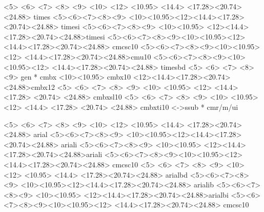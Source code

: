 \def\fileversion{v2.2f}
\def\filedate{1994/06/21}

   {  <5> <6> <7> <8> <9> <10> <12> 
      <10.95> 
      <14.4>  
      <17.28><20.74><24.88> times}{}
    {
      <5><6><7><8><9>
      <10><10.95><12><14.4><17.28><20.74><24.88> timesi%
      }{}
    {
      <5><6><7><8><9>
      <10><10.95>
      <12><14.4><17.28><20.74><24.88>timesi%
      }{}
    {
      <5><6><7><8><9><10><10.95><12>
      <14.4><17.28><20.74><24.88> cmcsc10
      }{}
%
   {
      <5><6><7><8><9><10><10.95><12>%
      <14.4><17.28><20.74><24.88>cmu10%
      }{}
     {
      <5><6><7><8><9><10><10.95><12>
      <14.4><17.28><20.74><24.88> timesbd}{}
   {
      <5> <6> <7> <8> <9> gen * cmbx
      <10><10.95> cmbx10
      <12><14.4><17.28><20.74><24.88>cmbx12
      }{}
      {
      <5> <6> <7> <8> <9>
      <10> <10.95> <12> <14.4> <17.28> <20.74> <24.88> cmbxsl10
      }{}
      {
      <5> <6>  <7>  <8> <9>
      <10> <10.95> <12> <14.4> <17.28> <20.74> <24.88> cmbxti10
      }{}
%
      {<->ssub * cmr/m/ui}{}





   {  <5> <6> <7> <8> <9> <10> <12> 
      <10.95> 
      <14.4>  
      <17.28><20.74><24.88> arial}{}
    {
      <5><6><7><8><9>
      <10><10.95><12><14.4><17.28><20.74><24.88> ariali%
      }{}
    {
      <5><6><7><8><9>
      <10><10.95>
      <12><14.4><17.28><20.74><24.88>ariali%
      }{}
    {
      <5><6><7><8><9><10><10.95><12>
      <14.4><17.28><20.74><24.88> cmcsc10
      }{}
   {  <5> <6> <7> <8> <9> <10> <12> 
      <10.95> 
      <14.4>  
      <17.28><20.74><24.88> arialbd}{}
    {
      <5><6><7><8><9>
      <10><10.95><12><14.4><17.28><20.74><24.88> arialib%
      }{}
    {
      <5><6><7><8><9>
      <10><10.95>
      <12><14.4><17.28><20.74><24.88>arialbi%
      }{}
    {
      <5><6><7><8><9><10><10.95><12>
      <14.4><17.28><20.74><24.88> cmcsc10
      }{}



